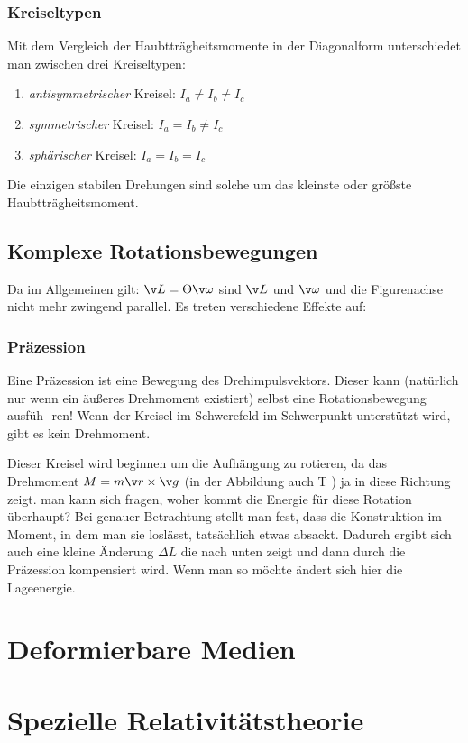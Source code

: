 \documentclass[twocolumn, bfvec]{summery_5.0}
\begin{document}
\subsubsection{Kreiseltypen}
Mit dem Vergleich der Haubtträgheitsmomente in der Diagonalform unterschiedet man zwischen drei Kreiseltypen:
\begin{enumerate}
    \item \emph{antisymmetrischer} Kreisel: \(I_a \neq I_b \neq I_c\)
    \item \emph{symmetrischer} Kreisel: \(I_a = I_b \neq I_c\)
    \item \emph{sphärischer} Kreisel: \(I_a = I_b = I_c\) 
\end{enumerate}
Die einzigen stabilen Drehungen sind solche um das kleinste oder größste Haubtträgheitsmoment.


\subsection{Komplexe Rotationsbewegungen}
Da im Allgemeinen gilt: \(\v L = \Theta \v \omega\) sind \(\v L\) und \(\v \omega\) und die Figurenachse nicht mehr zwingend parallel. Es treten verschiedene Effekte auf:

\subsubsection{Präzession}
Eine Präzession ist eine Bewegung des Drehimpulsvektors. Dieser kann (natürlich
nur wenn ein äußeres Drehmoment existiert) selbst eine Rotationsbewegung ausfüh-
ren! Wenn der Kreisel im Schwerefeld im Schwerpunkt unterstützt wird, gibt es kein Drehmoment.

Dieser Kreisel wird beginnen um die Aufhängung zu rotieren, da das Drehmoment
$M = m\v r \times \v g$ (in der Abbildung auch T ) ja in diese Richtung zeigt. man kann
sich fragen, woher kommt die Energie für diese Rotation überhaupt? Bei genauer
Betrachtung stellt man fest, dass die Konstruktion im Moment, in dem man sie
loslässt, tatsächlich etwas absackt. Dadurch ergibt sich auch eine kleine Änderung $\Delta L$ die nach unten zeigt und dann durch die Präzession kompensiert wird. Wenn man so möchte ändert sich hier die Lageenergie.


\section{Deformierbare Medien}

\section{Spezielle Relativitätstheorie}
\end{document}
